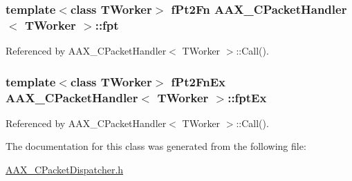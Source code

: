 \subsubsection[{fpt}]{\setlength{\rightskip}{0pt plus 5cm}template$<$class T\+Worker$>$ f\+Pt2\+Fn {\bf A\+A\+X\+\_\+\+C\+Packet\+Handler}$<$ T\+Worker $>$\+::fpt\hspace{0.3cm}{\ttfamily [protected]}}\label{a00032_a9350d1cc36f20c821c90d2372219561f}


Referenced by A\+A\+X\+\_\+\+C\+Packet\+Handler$<$ T\+Worker $>$\+::\+Call().

\hypertarget{a00032_aca6624820388e64f13d1b824dde033f5}{}
\subsubsection[{fpt\+Ex}]{\setlength{\rightskip}{0pt plus 5cm}template$<$class T\+Worker$>$ f\+Pt2\+Fn\+Ex {\bf A\+A\+X\+\_\+\+C\+Packet\+Handler}$<$ T\+Worker $>$\+::fpt\+Ex\hspace{0.3cm}{\ttfamily [protected]}}\label{a00032_aca6624820388e64f13d1b824dde033f5}


Referenced by A\+A\+X\+\_\+\+C\+Packet\+Handler$<$ T\+Worker $>$\+::\+Call().



The documentation for this class was generated from the following file\+:\begin{DoxyCompactItemize}
\item 
\hyperlink{a00189}{A\+A\+X\+\_\+\+C\+Packet\+Dispatcher.\+h}\end{DoxyCompactItemize}
